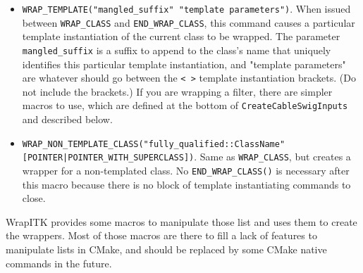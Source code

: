 \documentclass{InsightArticle}
\begin{document}
\begin{itemize}
  \item \verb$WRAP_TEMPLATE("mangled_suffix" "template parameters")$. When issued between \verb$WRAP_CLASS$
and \verb$END_WRAP_CLASS$, this command causes a particular template instantiation of
the current class to be wrapped. The parameter \verb$mangled_suffix$ is a suffix to
append to the class's name that uniquely identifies this particular template
instantiation, and "template parameters" are whatever should go between the \verb$< >$
template instantiation brackets. (Do not include the brackets.) If you are
wrapping a filter, there are simpler macros to use, which are defined at the
bottom of \verb$CreateCableSwigInputs$ and described below.

  \item \verb$WRAP_NON_TEMPLATE_CLASS("fully_qualified::ClassName" [POINTER|POINTER_WITH_SUPERCLASS])$.
Same as \verb$WRAP_CLASS$, but creates a wrapper
for a non-templated class. No \verb$END_WRAP_CLASS()$ is necessary after this macro
because there is no block of template instantiating commands to close.

\end{itemize}

WrapITK provides some macros to manipulate those list and uses them
to create the wrappers. Most of those macros are there to fill a lack
of features to manipulate lists in CMake, and should be replaced by
some CMake native commands in the future.
\end{document}

